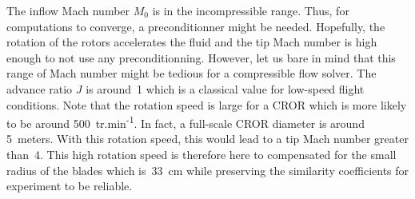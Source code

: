The inflow Mach number $M_0$ is in the incompressible range.
Thus, for computations to converge, a preconditionner might be
needed. Hopefully, the rotation of the rotors accelerates the fluid
and the tip Mach number is high enough to not use any preconditionning.
However, let us bare in mind that this range of Mach number might
be tedious for a compressible flow solver.
The advance ratio $J$ is around~1 which is a classical value for
low-speed flight conditions. Note that the rotation speed is large
for a CROR which is more likely to be around 500~tr.min\textsuperscript{-1}.
In fact, a full-scale CROR diameter is around 5~meters. With this rotation speed,
this would lead to a tip Mach number greater than~4. This high rotation speed is 
therefore here to compensated for the small radius of the blades which is~33~cm
while preserving the similarity coefficients for experiment to be reliable.
